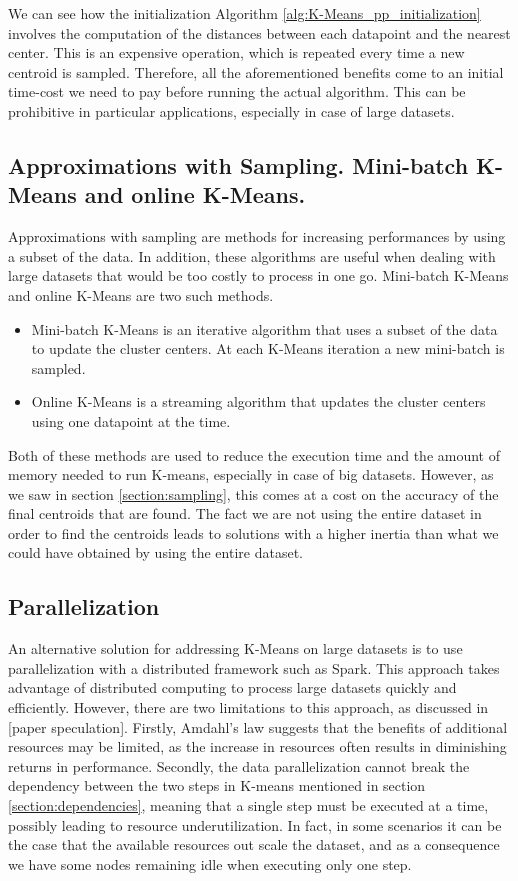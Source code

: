 We can see how the initialization Algorithm \ref{alg:K-Means_pp_initialization} involves the computation of the distances between each datapoint and the nearest center. This is an expensive operation, which is repeated every time a new centroid is sampled. Therefore, all the aforementioned benefits come to an initial time-cost we need to pay before running the actual algorithm. This can be prohibitive in particular applications, especially in case of large datasets.

\subsection{Approximations with Sampling. Mini-batch K-Means and online K-Means.}
\label{section:approximation}
Approximations with sampling are methods for increasing performances by using a subset of the data. In addition, these algorithms are useful when dealing with large datasets that would be too costly to process in one go. 
Mini-batch K-Means and online K-Means are two such methods. 
\begin{itemize}
    \item Mini-batch K-Means is an iterative algorithm that uses a subset of the data to update the cluster centers. At each K-Means iteration a new mini-batch is sampled.
    \item Online K-Means is a streaming algorithm that updates the cluster centers using one datapoint at the time.
\end{itemize}
Both of these methods are used to reduce the execution time and the amount of memory needed to run K-means, especially in case of big datasets. However, as we saw in section \ref{section:sampling}, this comes at a cost on the accuracy of the final centroids that are found. The fact we are not using the entire dataset in order to find the centroids leads to solutions with a higher inertia than what we could have obtained by using the entire dataset.

\subsection{Parallelization}
\label{section:parallelization}
An alternative solution for addressing K-Means on large datasets is to use parallelization with a distributed framework such as Spark. This approach takes advantage of distributed computing to process large datasets quickly and efficiently. However, there are two limitations to this approach, as discussed in [paper speculation]. Firstly, Amdahl's law suggests that the benefits of additional resources may be limited, as the increase in resources often results in diminishing returns in performance. Secondly, the data parallelization cannot break the dependency between the two steps in K-means mentioned in section \ref{section:dependencies}, meaning that a single step must be executed at a time, possibly leading to resource underutilization. In fact, in some scenarios it can be the case that the available resources out scale the dataset, and as a consequence we have some nodes remaining idle when executing only one step. 

